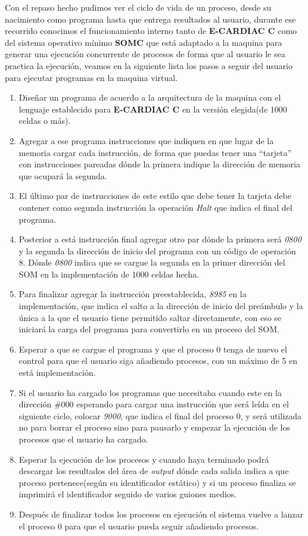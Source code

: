 \documentclass[letterpaper,12pt,oneside]{book}
\begin{document}
			Con el repaso hecho pudimos ver el ciclo de vida de un proceso, desde su nacimiento como programa hasta que entrega resultados al usuario,
			durante ese recorrido conocimos el funcionamiento interno tanto de \textbf{E-CARDIAC C} como del sistema operativo mínimo \textbf{SOMC} que
			está adaptado a la maquina para generar una ejecución concurrente de procesos de forma que al usuario le sea practica la ejecución, veamos
			en la siguiente lista los pasos a seguir del usuario para ejecutar programas en la maquina virtual.
			
			\begin{enumerate}

				\item Diseñar un programa de acuerdo a la arquitectura de la maquina con el lenguaje establecido para \textbf{E-CARDIAC C} en
				la versión elegida(de 1000 celdas o más).
				\item Agregar a ese programa instrucciones que indiquen en que lugar de la memoria cargar cada instrucción, de forma que puedas tener
				una ``tarjeta'' con instrucciones pareadas dónde la primera indique la dirección de memoria que ocupará la segunda.
				\item El último par de instrucciones de este estilo que debe tener la tarjeta debe contener como segunda instrucción
				la operación \textit{Halt} que indica el final del programa.
				\item Posterior a está instrucción final agregar otro par dónde la primera será \textit{0800} y la segunda la dirección de inicio del
				programa con un código de operación 8. Dónde \textit{0800} indica que se cargue la segunda en la primer dirección del SOM en
				la implementación de 1000 celdas hecha.
				\item Para finalizar agregar la instrucción preestablecida, \textit{8985} en la implementación, que indica el salto a la dirección de 
				inicio del preámbulo y
				la única a la que el usuario tiene permitido saltar directamente, con eso se iniciará la carga del programa para convertirlo en
				un proceso del SOM.
				\item Esperar a que se cargue el programa y que el proceso 0 tenga de nuevo el control para que el usuario siga añadiendo procesos, con 
				un
				máximo de 5 en está implementación.
				\item Si el usuario ha cargado los programas que necesitaba cuando este en la dirección \#000 esperando para cargar una instrucción
				que será leída en el siguiente ciclo, colocar \textit{9000}, que indica el final del proceso 0, y será utilizada no para borrar el 
				proceso
				sino para pausarlo y empezar la ejecución de los procesos que el usuario ha cargado.
				\item Esperar la ejecución de los procesos y cuando haya terminado podrá descargar los resultados del área de \textit{output} dónde
				cada salida indica a que proceso pertenece(según su identificador estático) y si un proceso finaliza se imprimirá el identificador
				seguido de varios guiones medios.
				\item Después de finalizar todos los procesos en ejecución el sistema vuelve a lanzar el proceso 0 para que el usuario pueda
				seguir añadiendo procesos.
				

\end{enumerate}
\end{document}
